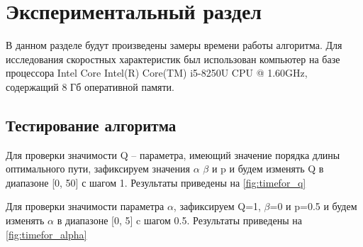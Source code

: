 \chapter{ Экспериментальный раздел}

В данном разделе будут произведены замеры времени работы алгоритма. Для исследования скоростных характеристик был использован компьютер на базе процессора Intel Core Intel(R) Core(TM) i5-8250U CPU @ 1.60GHz, содержащий 8 Гб оперативной памяти.

\section{ Тестирование алгоритма}

Для проверки значимости Q -- параметра, имеющий значение порядка длины оптимального пути, зафиксируем значения $\alpha$ $\beta$ и p и будем изменять Q  в диапазоне [0, 50] с шагом 1. Результаты приведены на \ref{fig:timefor_q}

\begin{figure}[ht!]
\end{figure}

Для проверки значимости параметра $\alpha$, зафиксируем Q=1, $\beta$=0 и p=0.5 и будем изменять $\alpha$ в диапазоне [0, 5] c шагом 0.5. Результаты приведены на \ref{fig:timefor_alpha}

